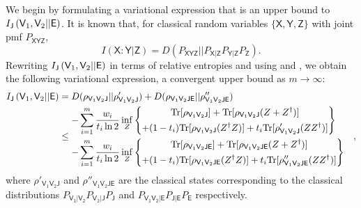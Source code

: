 \documentclass[10pt, a4paper]{article}
\numberwithin{equation}{section} %
\theoremstyle{definition}
\theoremstyle{plain}
\newcommand{\?}{\mathrel{?}} %
\newcommand{\Tr}{\mathrm{Tr}} %
\newcommand{\crv}[1]{\mathsf{#1}}
\begin{document}
    We begin by formulating a variational expression that is an upper bound to \(\splitkey{\crv{V}_1, \crv{V}_2}{\crv{E}}\). It is known that, for classical random variables \(\{\crv{X}, \crv{Y}, \crv{Z}\}\) with joint pmf \(P_{\crv{XYZ}}\),
    \[ I(\crv{X}:\crv{Y}|\crv{Z}) = D\left(P_{\crv{XYZ}}||P_{\crv{X}|\crv{Z}} P_{\crv{Y}|\crv{Z}} P_{\crv{Z}}\right). \]
    Rewriting \(\splitkey{\crv{V}_1,\crv{V}_2}{\crv{E}}\) in terms of relative entropies and using  and , we obtain the following variational expression, a convergent upper bound as \(m\to\infty\):
    \begin{align}
      \splitkey{\crv{V}_1,\crv{V}_2}{\crv{E}} &=  D(\rho_{\crv{V}_1\crv{V}_2\crv{J}}||\rho'_{\crv{V}_1\crv{V}_2\crv{J}})
      + D(\rho_{\crv{V}_1\crv{V}_2\crv{JE}}||\rho''_{\crv{V}_1\crv{V}_2\crv{JE}}) \\
                                              &\leq \begin{aligned}
    - & \sum_{i=1}^m  \frac{w_i}{t_i\ln{2}}  \inf_{Z} \left\{ \begin{gathered}
    \Tr[\rho_{\crv{V}_1\crv{V}_2\crv{J}}]
    + \Tr[\rho_{\crv{V}_1\crv{V}_2\crv{J}} (Z + Z^{\dagger})] \\
    + (1-t_i) \Tr[\rho_{\crv{V}_1\crv{V}_2\crv{J}} (Z^{\dagger}Z)] 
    + t_i \Tr[\rho'_{\crv{V}_1\crv{V}_2\crv{J}} (ZZ^{\dagger})]
    \end{gathered} \right\} \\
    - & \sum_{i=1}^m \frac{w_i}{t_i\ln{2}} \inf_Z \left\{ \begin{gathered}
    \Tr[\rho_{\crv{V}_1\crv{V}_2\crv{JE}}]
    + \Tr[\rho_{\crv{V}_1\crv{V}_2\crv{JE}} (Z + Z^{\dagger})] \\
    + (1-t_i) \Tr[\rho_{\crv{V}_1\crv{V}_2\crv{JE}} (Z^{\dagger}Z)]
    + t_i \Tr[\rho''_{\crv{V}_1\crv{V}_2\crv{JE}} (ZZ^{\dagger})]
    \end{gathered} \right\}
    \end{aligned},
    \end{align}
    where \(\rho'_{\crv{V}_1\crv{V}_2\crv{J}}\) and \(\rho''_{\crv{V}_1\crv{V}_2\crv{JE}}\) are the classical states corresponding to the classical distributions \(P_{\crv{V_1|V_2}} P_{\crv{V}_2|\crv{J}} P_{\crv{J}}\) and \(P_{\crv{V_1V_2|E}} P_{\crv{J|E}} P_{\crv{E}}\) respectively.
\end{document}
